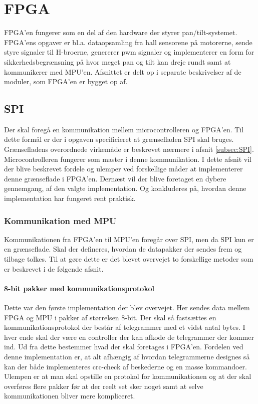 \section{FPGA}
FPGA'en fungerer som en del af den hardware der styrer pan/tilt-systemet. FPGA'ens opgaver er bl.a. dataopsamling fra hall sensorene på motorerne, sende styre signaler til H-broerne, genererer pwm signaler og implementerer en form for sikkerhedsbegrænsning på hvor meget pan og tilt kan dreje rundt samt at kommunikerer med MPU'en. Afsnittet er delt op i separate beskrivelser af de moduler, som FPGA'en er bygget op af. \\

\subsection{SPI}
Der skal foregå en kommunikation mellem microcontrolleren og FPGA'en. Til dette formål er der i opgaven specificieret at grænsefladen SPI skal bruges. Grænsefladens overordnede virkemåde er beskrevet nærmere i afsnit \ref{subsec:SPI}. Microcontrolleren fungerer som master i denne kommunikation. I dette afsnit vil der blive beskrevet fordele og ulemper ved forskellige måder at implementerer denne grænseflade i FPGA'en. Dernæst vil der blive foretaget en dybere gennemgang, af den valgte implementation. Og konkluderes på, hvordan denne implementation har fungeret rent praktisk.

\subsubsection{Kommunikation med MPU}
Kommunikationen fra FPGA'en til MPU'en foregår over SPI, men da SPI kun er en grænseflade. Skal der defineres, hvordan de datapakker der sendes frem og tilbage tolkes. Til at gøre dette er det blevet overvejet to forskellige metoder som er beskrevet i de følgende afsnit.

\paragraph*{8-bit pakker med kommunikationsprotokol}
Dette var den første implementation der blev overvejet. Her sendes data mellem FPGA og MPU i pakker af størrelsen 8-bit. Der skal så fastsættes en kommunikationsprotokol der består af telegrammer med et vidst antal bytes. I hver ende skal der være en controller der kan afkode de telegrammer der kommer ind. Ud fra dette bestemmer hvad der skal foretages i FPGA'en. Fordelen ved denne implementation er, at alt afhængig af hvordan telegrammerne designes så kan der både implementeres crc-check af beskederne og en masse kommandoer. Ulempen er at man skal opstille en protokol for kommunikationen og at der skal overføres flere pakker før at der reelt set sker noget samt at selve kommunikationen bliver mere kompliceret.

